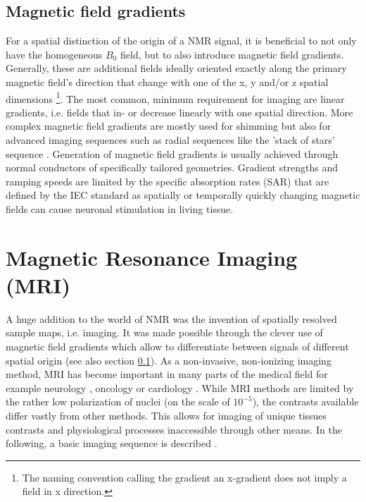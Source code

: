         \subsection{Magnetic field gradients}
            \label{sec:theory:magneticGradient}
            For a spatial distinction of the origin of a NMR signal, it is beneficial to not only have the homogeneous $B_0$ field, but to also introduce magnetic field gradients. Generally, these are additional fields ideally oriented exactly along the primary magnetic field's direction that change with one of the x, y and/or z spatial dimensions \footnote[2]{The naming convention calling the gradient an x-gradient does not imply a field in x direction.}. The most common, minimum requirement for imaging are linear gradients, i.e. fields that in- or decrease linearly with one spatial direction. More complex magnetic field gradients \cite{littin_development_2018} are mostly used for shimming \cite{kim_regularized_2002} but also for advanced imaging sequences such as radial sequences like the 'stack of stars' sequence \cite{burdumy_one-second_2016}. Generation of magnetic field gradients is usually achieved through normal conductors of specifically tailored geometries. Gradient strengths and ramping speeds are limited by the specific absorption rates (SAR) that are defined by the IEC standard \cite{noauthor_iec_nodate} as spatially or temporally quickly changing magnetic fields can cause neuronal stimulation in living tissue. 
    \section{Magnetic Resonance Imaging (MRI)}
        \label{sec:theory:MRI}
        A huge addition to the world of NMR was the invention of spatially resolved sample maps, i.e. imaging. It was made possible through the clever use of magnetic field gradients which allow to differentiate between signals of different spatial origin (see also section \ref{sec:theory:magneticGradient}).
        As a non-invasive, non-ionizing imaging method, MRI has become important in many parts of the medical field for example neurology \cite{frisoni_clinical_2010}, oncology \cite{padhani_dynamic_2002} or cardiology \cite{constantine_role_2004}. While MRI methods are limited by the rather low polarization of nuclei (on the scale of $10^{-5}$), the contrasts available differ vastly from other methods. This allows for imaging of unique tissues contrasts and physiological processes inaccessible through other means. In the following, a basic imaging sequence is described \cite{noauthor_wiley-vch_nodate}.
